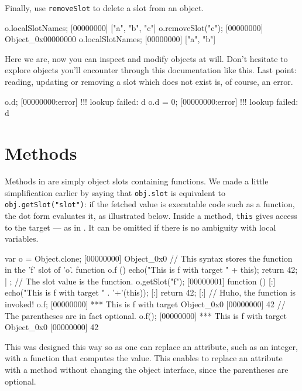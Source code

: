 Finally, use \lstinline{removeSlot} to delete a slot from an object.

\begin{urbiscript}[firstnumber=last]
o.localSlotNames;
[00000000] ["a", "b", "c"]
o.removeSlot("c");
[00000000] Object_0x00000000
o.localSlotNames;
[00000000] ["a", "b"]
\end{urbiscript}

Here we are, now you can inspect and modify objects at will. Don't
hesitate to explore \us objects you'll encounter through this
documentation like this. Last point: reading, updating or removing a
slot which does not exist is, of course, an error.

\begin{urbiscript}[firstnumber=last]
o.d;
[00000000:error] !!! lookup failed: d
o.d = 0;
[00000000:error] !!! lookup failed: d
\end{urbiscript}

\section{Methods}

Methods in \us are simply object slots containing functions. We made a
little simplification earlier by saying that \lstinline|obj.slot| is
equivalent to \lstinline|obj.getSlot("slot")|: if the fetched value is
executable code such as a function, the dot form evaluates it, as
illustrated below. Inside a method, \lstinline|this| gives access to
the target --- as in \Cxx.  It can be omitted if there is no ambiguity
with local variables.

\begin{urbiscript}
var o = Object.clone;
[00000000] Object_0x0
// This syntax stores the function in the 'f' slot of 'o'.
function o.f ()
{
  echo("This is f with target " + this);
  return 42;
} | {};
// The slot value is the function.
o.getSlot("f");
[00000001] function () {
[:]  echo("This is f with target " . '+'(this));
[:]  return 42;
[:]}
// Huho, the function is invoked!
o.f;
[00000000] *** This is f with target Object_0x0
[00000000] 42
// The parentheses are in fact optional.
o.f();
[00000000] *** This is f with target Object_0x0
[00000000] 42
\end{urbiscript}

This was designed this way so as one can replace an attribute, such as
an integer, with a function that computes the value. This enables to
replace an attribute with a method without changing the object
interface, since the parentheses are optional.


